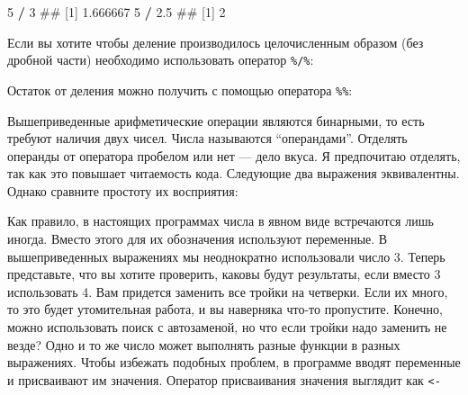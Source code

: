 \documentclass[]{book}
\newenvironment{Shaded}{\begin{snugshade}}{\end{snugshade}}
\newcommand{\DecValTok}[1]{\textcolor[rgb]{0.00,0.00,0.81}{#1}}
\newcommand{\FloatTok}[1]{\textcolor[rgb]{0.00,0.00,0.81}{#1}}
\newcommand{\StringTok}[1]{\textcolor[rgb]{0.31,0.60,0.02}{#1}}
\newcommand{\OperatorTok}[1]{\textcolor[rgb]{0.81,0.36,0.00}{\textbf{#1}}}
\newcommand{\NormalTok}[1]{#1}
\begin{document}
\begin{Shaded}
\begin{Highlighting}[]
\DecValTok{5} \OperatorTok{/}\StringTok{ }\DecValTok{3}
\NormalTok{## [1] 1.666667}
\DecValTok{5} \OperatorTok{/}\StringTok{ }\FloatTok{2.5}
\NormalTok{## [1] 2}
\end{Highlighting}
\end{Shaded}

Если вы хотите чтобы деление производилось целочисленным образом (без
дробной части) необходимо использовать оператор \texttt{\%/\%}:

\begin{Shaded}
\end{Shaded}

Остаток от деления можно получить с помощью оператора \texttt{\%\%}:

\begin{Shaded}
\end{Shaded}

Вышеприведенные арифметические операции являются бинарными, то есть
требуют наличия двух чисел. Числа называются ``операндами''. Отделять
операнды от оператора пробелом или нет --- дело вкуса. Я предпочитаю
отделять, так как это повышает читаемость кода. Следующие два выражения
эквивалентны. Однако сравните простоту их восприятия:

\begin{Shaded}
\end{Shaded}

\begin{Shaded}
\end{Shaded}

Как правило, в настоящих программах числа в явном виде встречаются лишь
иногда. Вместо этого для их обозначения используют переменные. В
вышеприведенных выражениях мы неоднократно использовали число 3. Теперь
представьте, что вы хотите проверить, каковы будут результаты, если
вместо 3 использовать 4. Вам придется заменить все тройки на четверки.
Если их много, то это будет утомительная работа, и вы наверняка что-то
пропустите. Конечно, можно использовать поиск с автозаменой, но что если
тройки надо заменить не везде? Одно и то же число может выполнять разные
функции в разных выражениях. Чтобы избежать подобных проблем, в
программе вводят переменные и присваивают им значения. Оператор
присваивания значения выглядит как \texttt{\textless{}-}
\end{document}
